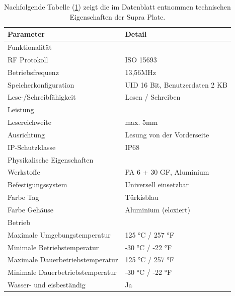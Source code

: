 \begin{table}[h!]
	\caption{Nachfolgende Tabelle (\ref{SupraPlate}) zeigt die im Datenblatt \cite{yoke:2025} entnommen technischen Eigenschaften der Supra Plate.}
	\begin{center}
		\begin{tabular}{|l|l|}
			\hline
			\textbf{Parameter} &\textbf{Detail} \\
			\hline
			Funktionalität &  	\\
			\hline
			RF Protokoll & ISO 15693 	\\
			\hline
			Betriebsfrequenz & 13,56MHz 	\\	
			\hline
			Speicherkonfiguration  & UID 16 Bit, Benutzerdaten 2 KB 	\\	
			\hline
			Lese-/Schreibfähigkeit & Lesen / Schreiben  	\\	
			\hline
			Leistung &   	\\	
			\hline
			Lesereichweite & max. 5mm 	\\	
			\hline
			Ausrichtung  & Lesung von der Vorderseite \\	
			\hline
			IP-Schutzklasse & IP68 \\	
			\hline
			Physikalische Eigenschaften &   \\	
			\hline
			Werkstoffe & PA 6 + 30 GF, Aluminium \\	
			\hline
			Befestigungssystem & Universell einsetzbar \\
			\hline
			Farbe Tag & Türkisblau 	\\	
			\hline
			Farbe Gehäuse & Aluminium (eloxiert) 	\\	
			\hline
			Betrieb &  	\\	
			\hline
			Maximale Umgebungstemperatur & 125 °C / 257 °F 	\\	
			\hline
			Minimale Betriebstemperatur & -30 °C / -22 °F	\\	
			\hline
			Maximale Dauerbetriebstemperatur  & 125 °C / 257 °F 	\\	
			\hline
			Minimale Dauerbetriebstemperatur & -30 °C / -22 °F	\\	
			\hline
			Wasser- und eisbeständig & Ja \\	
			\hline
			\end{tabular}
		\label{SupraPlate}
	\end{center}
\end{table} 

